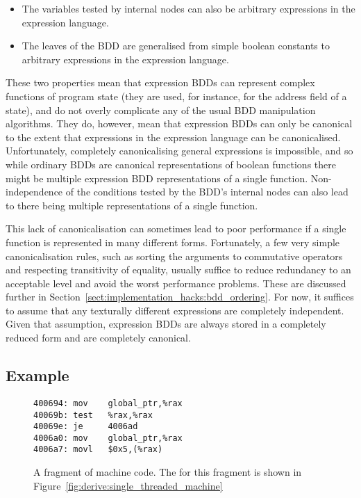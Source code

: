 \begin{itemize}
\item The variables tested by internal nodes can also be arbitrary
  expressions in the expression language.
\item The leaves of the BDD are generalised from simple boolean
  constants to arbitrary expressions in the expression language.
\end{itemize}

These two properties mean that expression BDDs can represent complex
functions of program state (they are used, for instance, for the
address field of a  state), and do not overly complicate
any of the usual BDD manipulation algorithms.  They do, however, mean
that expression BDDs can only be canonical to the extent that
expressions in the expression language can be canonicalised.
Unfortunately, completely canonicalising general expressions is
impossible, and so while
ordinary BDDs are canonical representations of boolean functions there
might be multiple expression BDD representations of a single function.
Non-independence of the conditions tested by the BDD's internal nodes
can also lead to there being multiple representations of a single
function.

This lack of canonicalisation can sometimes lead to poor performance
if a single function is represented in many different forms.
Fortunately, a few very simple canonicalisation rules, such as sorting
the arguments to commutative operators and respecting transitivity of
equality, usually suffice to reduce redundancy to an acceptable level
and avoid the worst performance problems.  These are discussed further
in Section~\ref{sect:implementation_hacks:bdd_ordering}.  For now, it
suffices to assume that any texturally different expressions are
completely independent.  Given that assumption, expression BDDs are
always stored in a completely reduced form and are completely
canonical.

\subsection{Example}

\begin{figure}
\begin{verbatim}
400694: mov    global_ptr,%rax
40069b: test   %rax,%rax
40069e: je     4006ad
4006a0: mov    global_ptr,%rax
4006a7: movl   $0x5,(%rax)
\end{verbatim}
\caption{A fragment of machine code.  The {\StateMachine} for this
  fragment is shown in
  Figure~\ref{fig:derive:single_threaded_machine}}
\label{fig:derive:single_threaded_machine_inp}
\end{figure}

